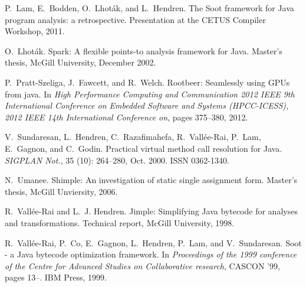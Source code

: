 \documentclass{sigplanconf}
\begin{document}
\begin{thebibliography}{10}
P.~Lam, E.~Bodden, O.~Lhot{\'a}k, and L.~Hendren.
\newblock The {Soot} framework for {Java} program analysis: a retrospective.
\newblock Presentation at the CETUS Compiler Workshop, 2011.

O.~Lhot{\'a}k.
\newblock Spark: A flexible points-to analysis framework for {Java}.
\newblock Master's thesis, McGill University, December 2002.

P.~Pratt-Szeliga, J.~Fawcett, and R.~Welch.
\newblock Rootbeer: Seamlessly using {GPUs} from java.
\newblock In \emph{High Performance Computing and Communication 2012 IEEE 9th
  International Conference on Embedded Software and Systems (HPCC-ICESS), 2012
  IEEE 14th International Conference on}, pages 375--380, 2012.

V.~Sundaresan, L.~Hendren, C.~Razafimahefa, R.~Vall{\'e}e-Rai, P.~Lam,
  E.~Gagnon, and C.~Godin.
\newblock Practical virtual method call resolution for {Java}.
\newblock \emph{SIGPLAN Not.}, 35 (10): 264--280, Oct. 2000.
\newblock ISSN 0362-1340.

N.~Umanee.
\newblock Shimple: An investigation of static single assignment form.
\newblock Master's thesis, McGill Unviersity, 2006.

R.~Vall{\'e}e-Rai and L.~J. Hendren.
\newblock Jimple: Simplifying {Java} bytecode for analyses and transformations.
\newblock Technical report, McGill University, 1998.

R.~Vall{\'e}e-Rai, P.~Co, E.~Gagnon, L.~Hendren, P.~Lam, and V.~Sundaresan.
\newblock Soot - a {Java} bytecode optimization framework.
\newblock In \emph{Proceedings of the 1999 conference of the Centre for
  Advanced Studies on Collaborative research}, CASCON '99, pages 13--. IBM
  Press, 1999.

\end{thebibliography}
\end{document}
